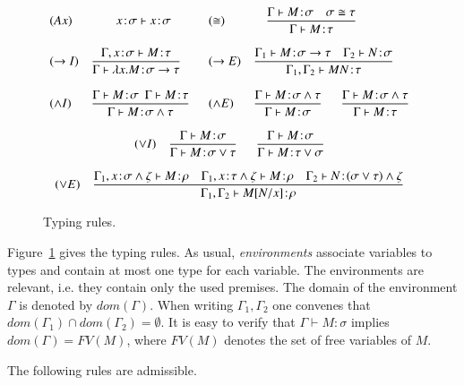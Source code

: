 \documentclass[UKenglish]{eptcs}
\newcommand{\dup}{\! : \!}
\newcommand{\tA}{\sigma}       \newcommand{\tB}{\tau}
\newcommand{\tC}{\rho}
\newcommand{\tD}{\zeta}
\newcommand{\B}{\Gamma}
\newcommand{\db}{\displaystyle}
\newcommand{\labelx}[1]{\label{#1}}
\newcommand{\esim}{\cong}
\begin{document}
\begin{figure}
\centerline{
$
\begin{array}{ll@{~~~~~~}ll}
(Ax)& \quad\quad   x\dup\tA \vdash x\dup\tA&
(\esim )& \quad \db  \frac{\B
\vdash M\dup\tA\quad \tA \esim \tB}{\B \vdash M\dup \tB}\\
\\
(\to I) &  \db \frac{\B,x\dup\tA \vdash M\dup\tB} {\B \vdash \lambda
x.M\dup\tA \to \tB} & (\to E) & \db \frac{\B_{1} \vdash M\dup\tA \to
\tB \quad
\B_{2} \vdash N\dup\tA}{\B_{1}, \B_{2} \vdash MN\dup\tB} \\
\\
(\wedge I) &  \db \frac{\B \vdash M\dup\tA ~~ \B \vdash M\dup\tB}
{\B \vdash M\dup\tA \wedge \tB} &
(\wedge E) & \db \frac{\B \vdash M\dup\tA \wedge \tB}{\B \vdash M\dup\tA}
~~~~~~\db \frac{\B \vdash M\dup\tA \wedge \tB}{\B \vdash M\dup\tB}\\
\\
\multicolumn{4}{c}{(\vee I) \quad  \db \frac{\B \vdash M\dup\tA}
{\B \vdash M\dup\tA\vee\tB}~~~~~~  \db \frac{\B \vdash M\dup\tA}
{\B \vdash M\dup\tB\vee\tA}}\\\\
\multicolumn{4}{c}{(\vee E) \quad \db \frac{\B_{1}, x\dup\tA\wedge\tD
\vdash M\dup\tC\quad \B_{1}, x\dup\tB\wedge\tD \vdash M\dup\tC\quad
\B_{2} \vdash N\dup(\tA\vee\tB)\wedge\tD}{\B_{1},\B_{2} \vdash
M[N/x]\dup\tC}}\end{array}
$
}
\caption{Typing rules.}\labelx{tr}
\end{figure}
Figure~\ref{tr} gives the typing rules.
 As usual, {\em environments} associate
variables to types and  contain at most one type for each variable.
The environments are relevant, i.e. they contain only the used premises. The domain of the environment $\Gamma$ is denoted by $dom(\Gamma)$. When writing $\Gamma_1,  \Gamma_2$ one convenes
that $dom(\Gamma_1)\cap  dom(\Gamma_2)=\emptyset$. It is easy to verify that $\B \vdash M\dup \tA$ implies $dom(\Gamma)=FV (M)$, where $FV (M)$ denotes the set of free variables of $M$. 

\smallskip

The following rules are admissible.

\smallskip
\end{document}
